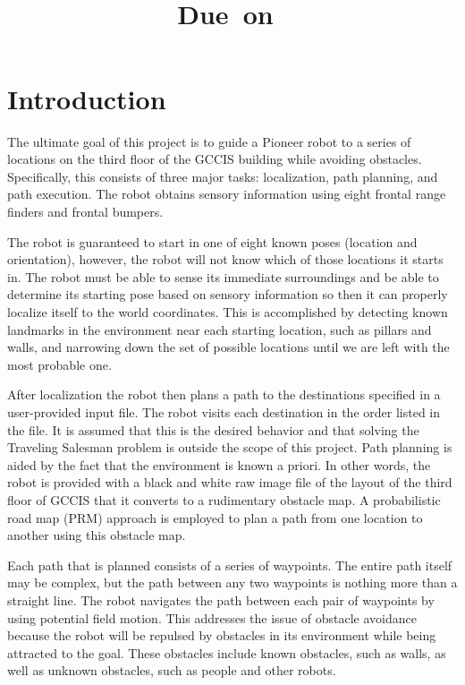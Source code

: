 \documentclass[12pt]{article}
\title{
  \vspace{2in}
  \textmd{\textbf{\hmwkTitle}} \\
  \vspace{0.1in}
  \large{\textmd{\hmwkClassInstructor}} \\
  \vspace{0.1in}
  \normalsize\small{Due\ on\ \hmwkDueDate} \\
  \vspace{3in}
}
\date{} %
\author{\textbf{\hmwkAuthorName}}
\begin{document}
\maketitle
\thispagestyle{empty}

\newpage %

\section{Introduction}

The ultimate goal of this project is to guide a Pioneer robot to a series of locations on the third floor of the GCCIS building while avoiding obstacles. Specifically, this consists of three major tasks: localization, path planning, and path execution. The robot obtains sensory information using eight frontal range finders and frontal bumpers.

The robot is guaranteed to start in one of eight known poses (location and orientation), however, the robot will not know which of those locations it starts in. The robot must be able to sense its immediate surroundings and be able to determine its starting pose based on sensory information so then it can properly localize itself to the world coordinates. This is accomplished by detecting known landmarks in the environment near each starting location, such as pillars and walls, and narrowing down the set of possible locations until we are left with the most probable one. 

After localization the robot then plans a path to the destinations specified in a user-provided input file. The robot visits each destination in the order listed in the file. It is assumed that this is the desired behavior and that solving the Traveling Salesman problem is outside the scope of this project. Path planning is aided by the fact that the environment is known a priori. In other words, the robot is provided with a black and white raw image file of the layout of the third floor of GCCIS that it converts to a rudimentary obstacle map. A probabilistic road map (PRM) approach is employed to plan a path from one location to another using this obstacle map.

Each path that is planned consists of a series of waypoints. The entire path itself may be complex, but the path between any two waypoints is nothing more than a straight line. The robot navigates the path between each pair of waypoints by using potential field motion. This addresses the issue of obstacle avoidance because the robot will be repulsed by obstacles in its environment while being attracted to the goal. These obstacles include known obstacles, such as walls, as well as unknown obstacles, such as people and other robots.
\end{document}
